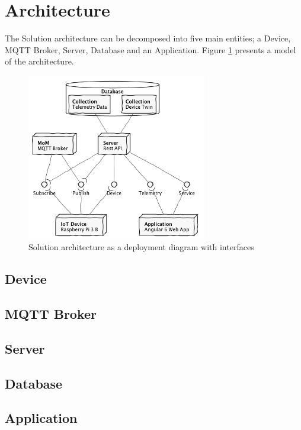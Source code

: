 \section{Architecture} \label{sec:architecture}

The Solution architecture can be decomposed into five main entities; a Device, MQTT Broker, Server, Database and an Application.
Figure \ref{fig:arc} presents a model of the architecture.

\begin{figure}[H]
    \centering
    \includegraphics[width=0.7\textwidth]{out/figures/uml/architecture/architecture.png}
    \caption{Solution architecture as a deployment diagram with interfaces}
    \label{fig:arc}
\end{figure}

\subsection{Device} 
\subsection{MQTT Broker} 
\subsection{Server} 
\subsection{Database} 
\subsection{Application} 